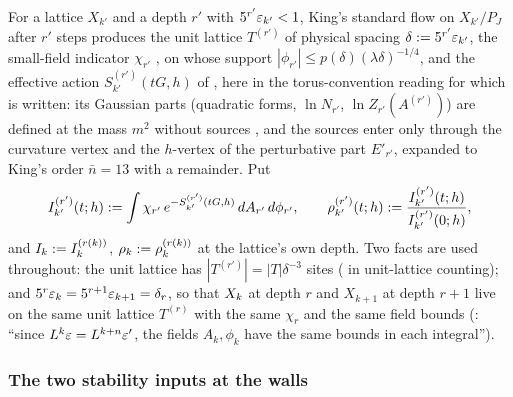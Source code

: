 For a lattice $X_{k'}$ and a depth $r'$ with $5^{r'}\varepsilon_{k'}<1$, King's standard flow \cite[\S3]{K1} on $X_{k'}/P_J$ after $r'$ steps produces the unit lattice $T^{(r')}$ of physical spacing $\delta:=5^{r'}\varepsilon_{k'}$, the small-field indicator $\chi_{r'}$ \cite[(3.2)]{K1}, on whose support $|\phi_{r'}|\le p(\delta)(\lambda\delta)^{-1/4}$, and the effective action $S^{(r')}_{k'}(tG,h)$ of , here in the torus-convention reading for which \cite{K1} is written: its Gaussian parts (quadratic forms, $\ln N_{r'}$, $\ln Z_{r'}(A^{(r')})$) are defined at the mass $m^2$ without sources \cite[(2.13)--(2.16)]{K1}, and the sources enter only through the curvature vertex \cite[(3.20)]{K1} and the $h$-vertex \cite[(3.21)]{K1} of the perturbative part $E'_{r'}$, expanded to King's order $\bar n=13$ with a remainder. Put
\[
I^{(r')}_{k'}(t;h):=\int\chi_{r'}\,e^{-S^{(r')}_{k'}(tG,h)}\,dA_{r'}\,d\phi_{r'},\qquad
\rho^{(r')}_{k'}(t;h):=\frac{I^{(r')}_{k'}(t;h)}{I^{(r')}_{k'}(0;h)},
\]
and $I_k:= I^{(r(k))}_k$, $\rho_k:=\rho^{(r(k))}_k$ at the lattice's own depth. Two facts are used throughout: the unit lattice has $|T^{(r')}|=|T|\delta^{-3}$ sites (\cite[(2.15)]{K1} in unit-lattice counting); and $5^r\varepsilon_k=5^{r+1}\varepsilon_{k+1}=\delta_r$, so that $X_k$ at depth $r$ and $X_{k+1}$ at depth $r+1$ live on the same unit lattice $T^{(r)}$ with the same $\chi_r$ and the same field bounds (\cite[p.~656]{K1}: ``since $L^k\varepsilon=L^{k+n}\varepsilon'$, the fields $A_k,\phi_k$ have the same bounds in each integral'').

\subsubsection*{The two stability inputs at the walls}

